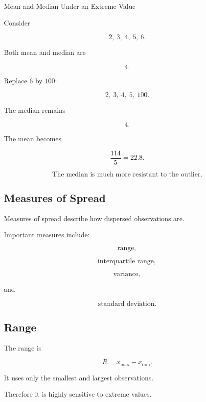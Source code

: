\begin{workedexamplebox}{Mean and Median Under an Extreme Value}

Consider

\[
2,\ 3,\ 4,\ 5,\ 6.
\]

Both mean and median are

\[
4.
\]

Replace \(6\) by \(100\):

\[
2,\ 3,\ 4,\ 5,\ 100.
\]

The median remains

\[
4.
\]

The mean becomes

\[
\frac{114}{5}=22.8.
\]

\begin{answerbox}
\[
\boxed{
\text{The median is much more resistant to the outlier.}
}
\]
\end{answerbox}

\end{workedexamplebox}

\subsection{Measures of Spread}
\label{subsec:measures-of-spread}

Measures of spread describe how dispersed observations are.

Important measures include:

\[
\boxed{
\text{range},
}
\]

\[
\boxed{
\text{interquartile range},
}
\]

\[
\boxed{
\text{variance},
}
\]

and

\[
\boxed{
\text{standard deviation}.
}
\]

\subsection{Range}
\label{subsec:range}

The range is

\[
\boxed{
R
=
x_{\max}-x_{\min}.
}
\]

It uses only the smallest and largest observations.

Therefore it is highly sensitive to extreme values.

